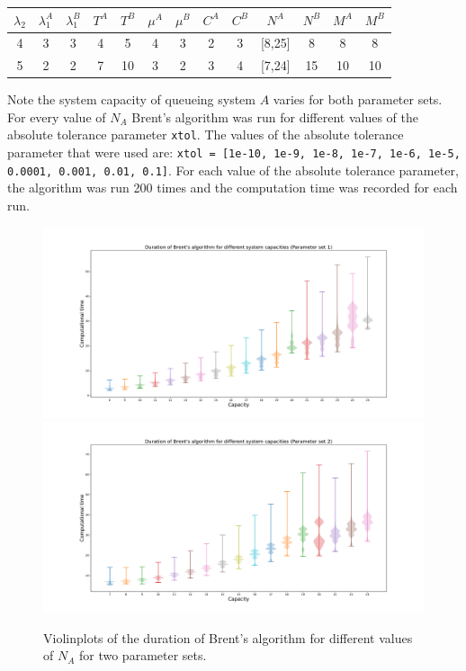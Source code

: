 \begin{center}
    \small
    \begin{tabular}{||c|c|c|c|c|c|c|c|c|c|c|c|c||}
        \hline
        \(\lambda_2\) & \(\lambda_1^A\) & \(\lambda_1^B\) & \(T^A\) & \(T^B\) &
        \(\mu^A\) & \(\mu^B\) & \(C^A\) & \(C^B\) & \(N^A\) & \(N^B\) & \(M^A\) &
        \(M^B\) \\
        \hline\hline
        4 & 3 & 3 & 4 & 5 & 4 & 3 & 2 & 3 & [8,25] & 8 & 8 & 8 \\
        \hline
        5 & 2 & 2 & 7 & 10 & 3 & 2 & 3 & 4 & [7,24] & 15 & 10 & 10 \\
        \hline
    \end{tabular}
\end{center}
    
Note the system capacity of queueing system \(A\) varies for both parameter sets.
For every value of \(N_A\) Brent's algorithm was run for different values of
the absolute tolerance parameter \lstinline[style=pystyle]{xtol}.
The values of the absolute tolerance parameter that were used are:
\lstinline[style=pystyle]
{xtol = [1e-10, 1e-9, 1e-8, 1e-7, 1e-6, 1e-5, 0.0001, 0.001, 0.01, 0.1]}.
For each value of the absolute tolerance parameter, the algorithm was run 200
times and the computation time was recorded for each run.


\begin{figure}[H]
    \centering
    \includegraphics[width=\textwidth]{chapters/04_game_theoretic_model/Bin/brents_method/tolerance/tolerance_violinplots_1.pdf}
    \includegraphics[width=\textwidth]{chapters/04_game_theoretic_model/Bin/brents_method/tolerance/tolerance_violinplots_2.pdf}
    \caption{
        Violinplots of the duration of Brent's algorithm for different values of
        \(N_A\) for two parameter sets.
    }
    \label{fig:tolerance_violinplots}
\end{figure}

